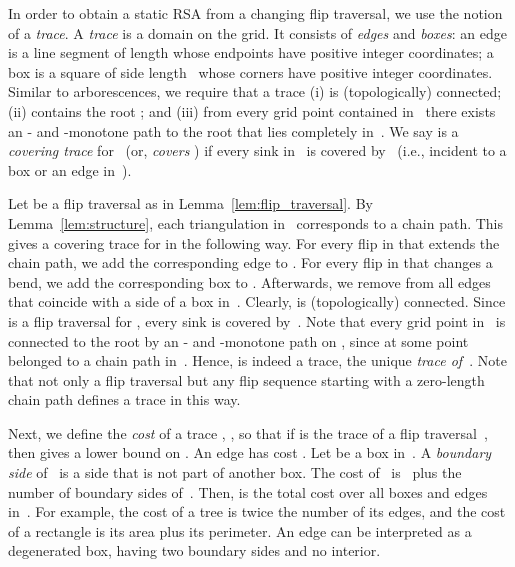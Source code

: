 \documentclass[a4paper,11pt]{article}
\begin{document}
In order to obtain a static RSA from a changing flip traversal,
we use the notion of a \emph{trace}.
A \emph{trace} is a domain on the grid.
It consists  of \emph{edges} and \emph{boxes}: an edge is a line segment of 
length  whose endpoints have positive integer coordinates; a box is a 
square of side length~ whose corners have positive integer coordinates.
Similar to arborescences, we require that a trace  (i) is (topologically) 
connected; (ii) contains the root ; and (iii) from every grid point 
contained in~ there exists an - and -monotone path to the root 
that lies completely in~.
We say  is a \emph{covering trace} for~ (or,  \emph{covers} ) if every sink in~ is covered by~ (i.e., incident to a box or an edge in~).

Let  be a flip traversal as in Lemma~\ref{lem:flip_traversal}.
By Lemma~\ref{lem:structure}, each triangulation in~ 
corresponds to a chain path.
This gives a covering trace  for  in the following way.
For every flip in  that extends 
the chain path, we add the corresponding edge to .
For every flip in  that changes a bend, we add the corresponding 
box to . Afterwards, we remove from  all edges that coincide 
with a side of a box in~.
Clearly,  is (topologically) connected. Since  is a 
flip traversal for , every sink
is covered by~.
Note that every grid point  in~ is connected to the root by an 
- and -monotone path on , since at some point  belonged
to a chain path in~.
Hence,  is indeed a trace, the unique \emph{trace of~}.
Note that not only a flip traversal but any flip sequence starting with a zero-length chain path defines a trace in this way.

Next, we define the \emph{cost} of a trace , , so that 
if  is the trace of a flip traversal~, then  
gives a lower bound on . 
An edge has cost .
Let  be a box in~.
A \emph{boundary side} of~ is a side that is not part of another box.
The cost of~ is~ plus the number of boundary sides of~.
Then,  is the total cost over all boxes and edges in~.
For example, the cost of a tree is twice the number of its edges, and the cost of 
a rectangle is its area plus its perimeter.
An edge can be interpreted as a degenerated box, having two boundary 
sides and no interior.
\end{document}
